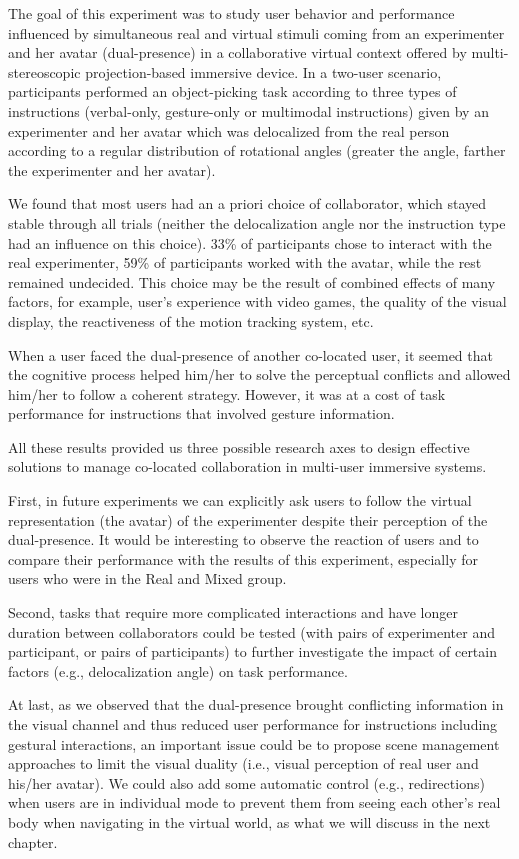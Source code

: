 The goal of this experiment was to study user behavior and performance influenced by simultaneous real and virtual stimuli coming from an experimenter and her avatar (dual-presence) in a collaborative virtual context offered by multi-stereoscopic projection-based immersive device. In a two-user scenario, participants performed an object-picking task according to three types of instructions (verbal-only, gesture-only or multimodal instructions) given by an experimenter and her avatar which was delocalized from the real person according to a regular distribution of rotational angles (greater the angle, farther the experimenter and her avatar).

We found that most users had an a priori choice of collaborator, which stayed stable through all trials (neither the delocalization angle nor the instruction type had an influence on this choice). 33\% of participants chose to interact with the real experimenter, 59\% of participants worked with the avatar, while the rest remained undecided. This choice may be the result of combined effects of many factors, for example, user's experience with video games, the quality of the visual display, the reactiveness of the motion tracking system, etc.

When a user faced the dual-presence of another co-located user, it seemed that the cognitive process helped him/her to solve the perceptual conflicts and allowed him/her to follow a coherent strategy. However, it was at a cost of task performance for instructions that involved gesture information.

All these results provided us three possible research axes to design effective solutions to manage co-located collaboration in multi-user immersive systems.

First, in future experiments we can explicitly ask users to follow the virtual representation (the avatar) of the experimenter despite their perception of the dual-presence. It would be interesting to observe the reaction of users and to compare their performance with the results of this experiment, especially for users who were in the Real and Mixed group.

Second, tasks that require more complicated interactions and have longer duration between collaborators could be tested (with pairs of experimenter and participant, or pairs of participants) to further investigate the impact of certain factors (e.g., delocalization angle) on task performance.

At last, as we observed that the dual-presence brought conflicting information in the visual channel and thus reduced user performance for instructions including gestural interactions, an important issue could be to propose scene management approaches to limit the visual duality (i.e., visual perception of real user and his/her avatar). We could also add some automatic control (e.g., redirections) when users are in individual mode to prevent them from seeing each other's real body when navigating in the virtual world, as what we will discuss in the next chapter.